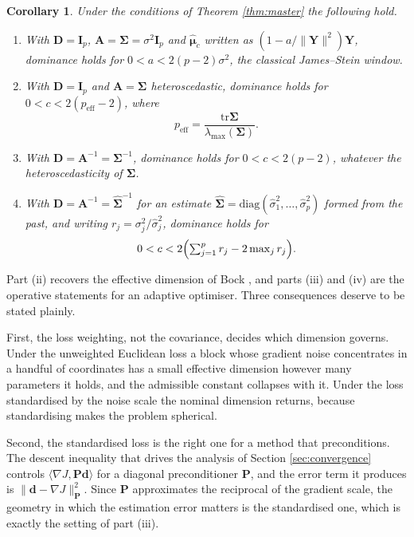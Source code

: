\documentclass[pdflatex,sn-mathphys-num]{sn-jnl}%
\theoremstyle{thmstyleone}%
\newtheorem{corollary}[theorem]{Corollary}%
\theoremstyle{thmstyletwo}%
\theoremstyle{thmstylethree}%
\newcommand{\peff}{p_{\mathrm{eff}}}
\newcommand{\tr}{\mathrm{tr}}
\newcommand{\diag}{\mathrm{diag}}
\begin{document}
\begin{corollary}
\label{cor:cases}
Under the conditions of Theorem \ref{thm:master} the following hold.
\begin{enumerate}
\item[(i)] With $\bm D=\bm I_p$, $\bm A=\bm\Sigma=\sigma^2\bm I_p$ and $\hat{\bm\mu}_c$ written as $(1-a/\|\bm Y\|^2)\bm Y$, dominance holds for $0<a<2(p-2)\sigma^2$, the classical James--Stein window.
\item[(ii)] With $\bm D=\bm I_p$ and $\bm A=\bm\Sigma$ heteroscedastic, dominance holds for $0<c<2(\peff-2)$, where
\begin{equation}
\peff=\frac{\tr\bm\Sigma}{\lambda_{\max}(\bm\Sigma)} .
\end{equation}
\item[(iii)] With $\bm D=\bm A^{-1}=\bm\Sigma^{-1}$, dominance holds for $0<c<2(p-2)$, whatever the heteroscedasticity of $\bm\Sigma$.
\item[(iv)] With $\bm D=\bm A^{-1}=\widehat{\bm\Sigma}^{-1}$ for an estimate $\widehat{\bm\Sigma}=\diag(\hat\sigma^2_1,\dots,\hat\sigma^2_p)$ formed from the past, and writing $r_j=\sigma^2_j/\hat\sigma^2_j$, dominance holds for
\begin{equation}
\label{eq:plugin_window}
0<c<2\Bigl(\textstyle\sum_{j=1}^{p}r_j-2\max_{j}r_j\Bigr) .
\end{equation}
\end{enumerate}
\end{corollary}

Part (ii) recovers the effective dimension of Bock \cite{bock1975}, and parts (iii) and (iv) are the operative statements for an adaptive optimiser. Three consequences deserve to be stated plainly.

First, the loss weighting, not the covariance, decides which dimension governs. Under the unweighted Euclidean loss a block whose gradient noise concentrates in a handful of coordinates has a small effective dimension however many parameters it holds, and the admissible constant collapses with it. Under the loss standardised by the noise scale the nominal dimension returns, because standardising makes the problem spherical.

Second, the standardised loss is the right one for a method that preconditions. The descent inequality that drives the analysis of Section \ref{sec:convergence} controls $\langle\nabla J,\bm P\bm d\rangle$ for a diagonal preconditioner $\bm P$, and the error term it produces is $\|\bm d-\nabla J\|^2_{\bm P}$. Since $\bm P$ approximates the reciprocal of the gradient scale, the geometry in which the estimation error matters is the standardised one, which is exactly the setting of part (iii).
\end{document}
